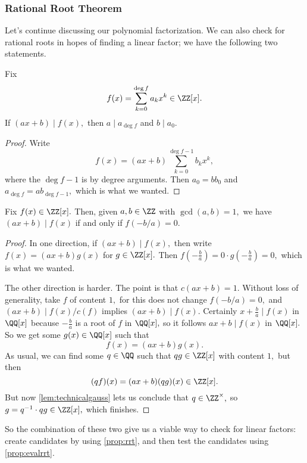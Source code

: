 \documentclass[../notes.tex]{subfiles}
\begin{document}
\subsubsection{Rational Root Theorem}
Let's continue discussing our polynomial factorization. We can also check for rational roots in hopes of finding a linear factor; we have the following two statements.
\begin{proposition} \label{prop:rrt}
	Fix
	\[f(x)=\sum_{k=0}^{\deg f}a_kx^k\in\ZZ[x].\]
	If $(ax+b)\mid f(x),$ then $a\mid a_{\deg f}$ and $b\mid a_0.$
\end{proposition}
\begin{proof}
	Write
	\[f(x)=(ax+b)\sum_{k=0}^{\deg f-1} b_kx^k,\]
	where the $\deg f-1$ is by degree arguments. Then $a_0=bb_0$ and $a_{\deg f}=ab_{\deg f-1},$ which is what we wanted.
\end{proof}
\begin{proposition} \label{prop:evalrrt}
	Fix $f(x)\in\ZZ[x].$ Then, given $a,b\in\ZZ$ with $\gcd(a,b)=1,$ we have $(ax+b)\mid f(x)$ if and only if $f(-b/a)=0.$
\end{proposition}
\begin{proof}
	In one direction, if $(ax+b)\mid f(x),$ then write $f(x)=(ax+b)g(x)$ for $g\in\ZZ[x].$ Then $f\left(-\frac ba\right)=0\cdot g\left(-\frac ba\right)=0,$ which is what we wanted.

	The other direction is harder. The point is that $c(ax+b)=1.$ Without loss of generality, take $f$ of content $1,$ for this does not change $f(-b/a)=0,$ and $(ax+b)\mid f(x)/c(f)$ implies $(ax+b)\mid f(x).$ Certainly $x+\frac ba\mid f(x)$ in $\QQ[x]$ because $-\frac ba$ is a root of $f$ in $\QQ[x],$ so it follows $ax+b\mid f(x)$ in $\QQ[x].$ So we get some $g(x)\in\QQ[x]$ such that
	\[f(x)=(ax+b)g(x).\]
	As usual, we can find some $q\in\QQ$ such that $qg\in\ZZ[x]$ with content $1,$ but then
	\[(qf)(x)=(ax+b)(qg)(x)\in\ZZ[x].\]
	But now \autoref{lem:technicalgauss} lets us conclude that $q\in\ZZ^\times,$ so $g=q^{-1}\cdot qg\in\ZZ[x],$ which finishes. 
\end{proof}
So the combination of these two give us a viable way to check for linear factors: create candidates by using \autoref{prop:rrt}, and then test the candidates using \autoref{prop:evalrrt}.
\end{document}
